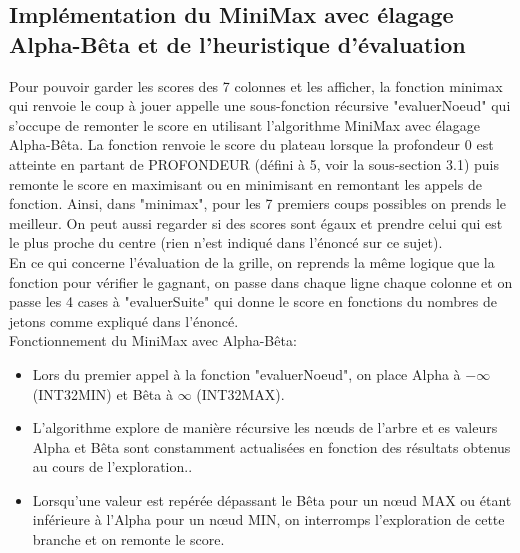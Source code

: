 \documentclass[a4paper,fleqn]{article}
\begin{document}
\pagebreak

\subsection{Implémentation du MiniMax avec élagage Alpha-Bêta et de l'heuristique d'évaluation}

Pour pouvoir garder les scores des 7 colonnes et les afficher, la fonction minimax qui renvoie le coup à jouer appelle une sous-fonction récursive "evaluerNoeud" qui s'occupe de remonter le score en utilisant l'algorithme MiniMax avec élagage Alpha-Bêta. La fonction renvoie le score du plateau lorsque la profondeur 0 est atteinte en partant de PROFONDEUR (défini à 5, voir la sous-section 3.1) puis remonte le score en maximisant ou en minimisant en remontant les appels de fonction. Ainsi, dans "minimax", pour les 7 premiers coups possibles on prends le meilleur. On peut aussi regarder si des scores sont égaux et prendre celui qui est le plus proche du centre (rien n'est indiqué dans l'énoncé sur ce sujet).\\

En ce qui concerne l'évaluation de la grille, on reprends la même logique que la fonction pour vérifier le gagnant, on passe dans chaque ligne chaque colonne et on passe les 4 cases à "evaluerSuite" qui donne le score en fonctions du nombres de jetons comme expliqué dans l'énoncé.\\

Fonctionnement du MiniMax avec Alpha-Bêta:  \\
\begin{itemize}

\item Lors du premier appel à la fonction "evaluerNoeud", on place Alpha à $-\infty$ (INT32MIN) et Bêta à $\infty$ (INT32MAX).\\

\item L'algorithme explore de manière récursive les nœuds de l'arbre et es valeurs Alpha et Bêta sont constamment actualisées en fonction des résultats obtenus au cours de l'exploration..\\

\item Lorsqu'une valeur est repérée dépassant le Bêta pour un nœud MAX ou étant inférieure à l'Alpha pour un nœud MIN, on interromps l'exploration de cette branche et on remonte le score. \\

\end{itemize}
\end{document}

